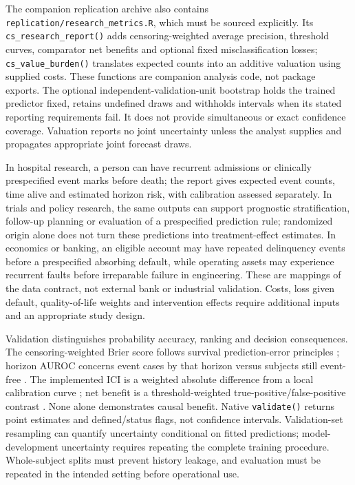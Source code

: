 \documentclass[article,nojss]{jss}
\newcommand{\code}[1]{\texttt{#1}}
\begin{document}
The companion replication archive also contains \code{replication/research\_metrics.R}, which must be sourced explicitly. Its \code{cs\_research\_report()} adds censoring-weighted average precision, threshold curves, comparator net benefits and optional fixed misclassification losses; \code{cs\_value\_burden()} translates expected counts into an additive valuation using supplied costs. These functions are companion analysis code, not package exports. The optional independent-validation-unit bootstrap holds the trained predictor fixed, retains undefined draws and withholds intervals when its stated reporting requirements fail. It does not provide simultaneous or exact confidence coverage. Valuation reports no joint uncertainty unless the analyst supplies and propagates appropriate joint forecast draws.

In hospital research, a person can have recurrent admissions or clinically prespecified event marks before death; the report gives expected event counts, time alive and estimated horizon risk, with calibration assessed separately. In trials and policy research, the same outputs can support prognostic stratification, follow-up planning or evaluation of a prespecified prediction rule; randomized origin alone does not turn these predictions into treatment-effect estimates. In economics or banking, an eligible account may have repeated delinquency events before a prespecified absorbing default, while operating assets may experience recurrent faults before irreparable failure in engineering. These are mappings of the data contract, not external bank or industrial validation. Costs, loss given default, quality-of-life weights and intervention effects require additional inputs and an appropriate study design.

Validation distinguishes probability accuracy, ranking and decision consequences. The censoring-weighted Brier score follows survival prediction-error principles \citep{Graf1999}; horizon AUROC concerns event cases by that horizon versus subjects still event-free \citep{Heagerty2000}. The implemented ICI is a weighted absolute difference from a local calibration curve \citep{Austin2019}; net benefit is a threshold-weighted true-positive/false-positive contrast \citep{Vickers2006}. None alone demonstrates causal benefit. Native \code{validate()} returns point estimates and defined/status flags, not confidence intervals. Validation-set resampling can quantify uncertainty conditional on fitted predictions; model-development uncertainty requires repeating the complete training procedure. Whole-subject splits must prevent history leakage, and evaluation must be repeated in the intended setting before operational use.
\end{document}
